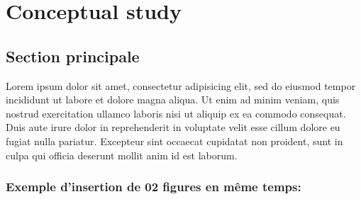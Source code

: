 \chapter{Conceptual study}

\section{Section principale}
Lorem ipsum dolor sit amet, consectetur adipisicing elit, sed do eiusmod
tempor incididunt ut labore et dolore magna aliqua. Ut enim ad minim veniam,
quis nostrud exercitation ullamco laboris nisi ut aliquip ex ea commodo
consequat. Duis aute irure dolor in reprehenderit in voluptate velit esse
cillum dolore eu fugiat nulla pariatur. Excepteur sint occaecat cupidatat non
proident, sunt in culpa qui officia deserunt mollit anim id est laborum.

\subsection{Exemple d'insertion de 02 figures en même temps:}

